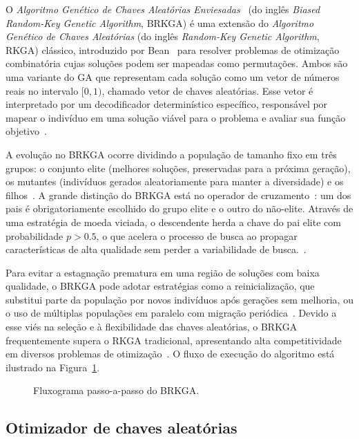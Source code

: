 O \emph{Algoritmo Genético de Chaves Aleatórias Enviesadas}~\cite{Resende2013} (do inglês \emph{Biased Random-Key Genetic Algorithm}, BRKGA) é uma extensão do \emph{Algoritmo Genético de Chaves Aleatórias} (do inglês \emph{Random-Key Genetic Algorithm}, RKGA) clássico, introduzido por Bean~\cite{Bean1994} para resolver problemas de otimização combinatória cujas soluções podem ser mapeadas como permutações. Ambos são uma variante do GA que representam cada solução como um vetor de números reais no intervalo $[0,1)$, chamado vetor de chaves aleatórias. Esse vetor é interpretado por um decodificador determinístico específico, responsável por mapear o indivíduo em uma solução viável para o problema e avaliar sua função objetivo~\cite{Resende2013}.

A evolução no BRKGA ocorre dividindo a população de tamanho fixo em três grupos: o conjunto elite (melhores soluções, preservadas para a próxima geração), os mutantes (indivíduos gerados aleatoriamente para manter a diversidade) e os filhos~\cite{Goncalves2011}. A grande distinção do BRKGA está no operador de cruzamento~\cite{Spears1991}: um dos pais é obrigatoriamente escolhido do grupo elite e o outro do não-elite. Através de uma estratégia de moeda viciada, o descendente herda a chave do pai elite com probabilidade $p > 0.5$, o que acelera o processo de busca ao propagar características de alta qualidade sem perder a variabilidade de busca.~\cite{Resende2013}.

Para evitar a estagnação prematura em uma região de soluções com baixa qualidade, o BRKGA pode adotar estratégias como a reinicialização, que substitui parte da população por novos indivíduos após gerações sem melhoria, ou o uso de múltiplas populações em paralelo com migração periódica~\cite{Resende2013}. Devido a esse viés na seleção e à flexibilidade das chaves aleatórias, o BRKGA frequentemente supera o RKGA tradicional, apresentando alta competitividade em diversos problemas de otimização~\cite{Resende2013,Londe2025}. O fluxo de execução do algoritmo está ilustrado na Figura~\ref{fig:fluxograma_BRKGA}.

    \begin{figure}[H]
        \centering
        \scalebox{0.65}{\fluxogramaBRKGA}
        \caption{Fluxograma passo-a-passo do BRKGA.}
        \label{fig:fluxograma_BRKGA}
    \end{figure}

\subsection{Otimizador de chaves aleatórias}

